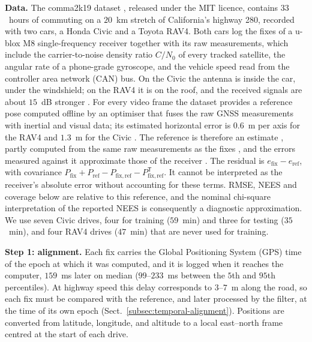 \documentclass[graybox,envcountchap]{style/SNmono}
\providecommand{\DIFadd}[1]{{\protect\color{blue} #1}} %
\providecommand{\DIFdel}[1]{{\protect\color{red} #1}} %
\providecommand{\DIFaddbegin}{} %
\providecommand{\DIFaddend}{} %
\providecommand{\DIFdelbegin}{} %
\providecommand{\DIFdelend}{} %
\begin{document}
\textbf{Data.} The comma2k19 dataset \cite{schafer2018_comma2k19}, released under the MIT licence, contains $33$~hours of commuting on a $20$~km stretch of California's highway 280, recorded with two cars, a Honda Civic and a Toyota RAV4. Both cars log the fixes of a u-blox M8 single-frequency receiver together with its raw measurements, which include the carrier-to-noise density ratio $C/N_0$ of every tracked satellite, the angular rate of a phone-grade gyroscope, and the vehicle speed read from the controller area network (CAN) bus. On the Civic the antenna is inside the car, under the windshield; on the RAV4 it is on the roof, and the received signals are about $15$~dB stronger \cite{schafer2018_comma2k19}. For every video frame the dataset provides a reference pose computed offline by an optimiser that fuses the raw GNSS measurements with inertial and visual data; its estimated horizontal error is $0.6$~m per axis for the RAV4 and $1.3$~m for the Civic \cite{schafer2018_comma2k19}. The reference is therefore an estimate \DIFdelbegin \DIFdel{, }\DIFdelend partly computed from the same raw measurements as the fixes\DIFdelbegin \DIFdel{, and the errors measured against it approximate those of the receiver}\DIFdelend \DIFaddbegin \DIFadd{. The residual is $e_{\mathrm{fix}}-e_{\mathrm{ref}}$, with covariance $P_{\mathrm{fix}}+P_{\mathrm{ref}}-P_{\mathrm{fix,ref}}-P_{\mathrm{fix,ref}}^{\mathsf T}$. It cannot be interpreted as the receiver's absolute error without accounting for these terms. RMSE, NEES and coverage below are relative to this reference, and the nominal chi-square interpretation of the reported NEES is consequently a diagnostic approximation}\DIFaddend . We use seven Civic drives, four for training ($59$~min) and three for testing ($35$~min), and four RAV4 drives ($47$~min) that are never used for training.

\textbf{Step 1: alignment.} Each fix carries the Global Positioning System (GPS) time of the epoch at which it was computed, and it is logged when it reaches the computer, $159$~ms later on median ($99$--$233$~ms between the $5$th and $95$th percentiles). At highway speed this delay corresponds to $3$--$7$~m along the road, so each fix must be compared with the reference, and later processed by the filter, at the time of its own epoch (Sect.~\ref{subsec:temporal-alignment}). Positions are converted from latitude, longitude, and altitude to a local east--north frame centred at the start of each drive.
\end{document}
